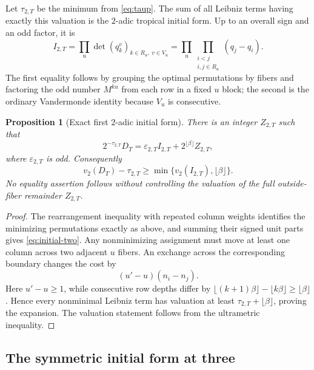 \documentclass[11pt,oneside]{article}
\newtheorem{proposition}[theorem]{Proposition}
\theoremstyle{definition}
\theoremstyle{remark}
\begin{document}
Let $\tau_{2,T}$ be the minimum from \eqref{eq:taup}.  The sum of all Leibniz terms having
exactly this valuation is the $2$-adic tropical initial form.  Up to an overall sign and an odd
factor, it is
\begin{equation}\label{eq:initial-two}
 I_{2,T}
 =\prod_u
   \det\!\left(q_k^v\right)_{k\in R_u,\ v\in V_u}
 =\prod_u\prod_{\substack{i<j\\i,j\in R_u}}(q_j-q_i).
\end{equation}
The first equality follows by grouping the optimal permutations by fibers and factoring the
odd number $M^{ku}$ from each row in a fixed $u$ block; the second is the ordinary Vandermonde
identity because $V_u$ is consecutive.

\begin{proposition}[Exact first $2$-adic initial form]\label{prop:initial-two}
There is an integer $Z_{2,T}$ such that
\begin{equation}\label{eq:two-layer-expansion}
 2^{-\tau_{2,T}}D_T
 =\varepsilon_{2,T} I_{2,T}+2^{\lfloor\beta\rfloor}Z_{2,T},
\end{equation}
where $\varepsilon_{2,T}$ is odd.  Consequently
\begin{equation}\label{eq:two-layer-min}
 v_2(D_T)-\tau_{2,T}
 \ge \min\{v_2(I_{2,T}),\lfloor\beta\rfloor\}.
\end{equation}
No equality assertion follows without controlling the valuation of the full outside-fiber
remainder $Z_{2,T}$.
\end{proposition}

\begin{proof}
The rearrangement inequality with repeated column weights identifies the minimizing
permutations exactly as above, and summing their signed unit parts gives
\eqref{eq:initial-two}.  Any nonminimizing assignment must move at least one column across two
adjacent $u$ fibers.  An exchange across the corresponding boundary changes the cost by
\[
 (u'-u)(n_i-n_j).
\]
Here $u'-u\ge1$, while consecutive row depths differ by
$\lfloor(k+1)\beta\rfloor-\lfloor k\beta\rfloor\ge\lfloor\beta\rfloor$.  Hence every
nonminimal Leibniz term has valuation at least $\tau_{2,T}+\lfloor\beta\rfloor$, proving the
expansion.  The valuation statement follows from the ultrametric inequality.
\end{proof}

\subsection{The symmetric initial form at three}
\end{document}
